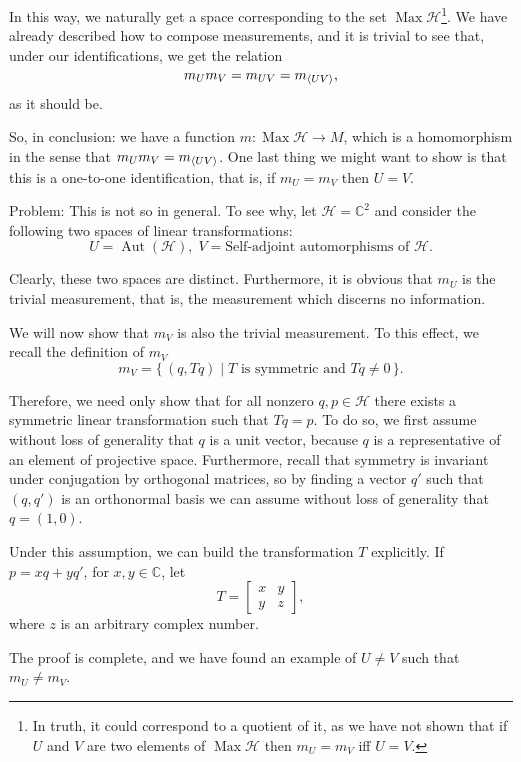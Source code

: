 \documentclass{article}
\theoremstyle{definition}
\theoremstyle{plain}
\DeclareMathOperator{\Max}{Max}
\DeclareMathOperator{\Aut}{Aut}
\newcommand{\C}{\mathbb{C}}
\newcommand{\HH}{\mathcal{H}}
\begin{document}
In this way, we naturally get a space corresponding to the set $\Max \HH$\footnote{In truth, it could correspond to a quotient of it, as we have not shown that if $U$ and $V$ are two elements of $\Max \HH$ then $m_U = m_V$ iff $U = V$.}. We have already described how to compose measurements, and it is trivial to see that, under our identifications, we get the relation
\[m_U m_V = m_{UV} = m_{\braket{UV}},\]
as it should be.

So, in conclusion: we have a function $m : \Max \HH \to M$, which is a homomorphism in the sense that $m_U m_V = m_{\braket{U V}}$. One last thing we might want to show is that this is a one-to-one identification, that is, if $m_U = m_V$ then $U = V$.

Problem: This is not so in general. To see why, let $\HH = \C^2$ and consider the following two spaces of linear transformations:
\[U = \Aut(\HH),\; V = \text{Self-adjoint automorphisms of $\HH$}.\]

Clearly, these two spaces are distinct. Furthermore, it is obvious that $m_U$ is the trivial measurement, that is, the measurement which discerns no information.

We will now show that $m_V$ is also the trivial measurement. To this effect, we recall the definition of $m_V$
\[m_V = \{\,(q,Tq) \mid \text{$T$ is symmetric and $Tq \neq 0$}\,\}.\]

Therefore, we need only show that for all nonzero $q, p \in \HH$ there exists a symmetric linear transformation such that $Tq = p$. To do so, we first assume without loss of generality that $q$ is a unit vector, because $q$ is a representative of an element of projective space. Furthermore, recall that symmetry is invariant under conjugation by orthogonal matrices, so by finding a vector $q'$ such that $(q,q')$ is an orthonormal basis we can assume without loss of generality that $q = (1,0)$.

Under this assumption, we can build the transformation $T$ explicitly. If $p = xq + yq'$, for $x, y \in \C$, let
\[T = \begin{bmatrix}
x & y\\
y & z
\end{bmatrix},\]
where $z$ is an arbitrary complex number.

The proof is complete, and we have found an example of $U \neq V$ such that $m_U \neq m_V$.




{}

\end{document}
